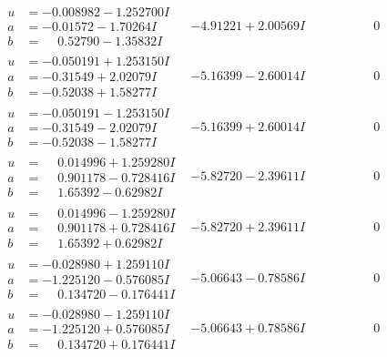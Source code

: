\documentclass[1p]{elsarticle_modified}
\theoremstyle{definition}
\begin{document}
$$\begin{array}{c|c|c}
\begin{aligned}
u &= -0.008982 - 1.252700 I \\
a &= -0.01572 - 1.70264 I \\
b &= \phantom{-}0.52790 - 1.35832 I\end{aligned}
 & -4.91221 + 2.00569 I & \phantom{-0.000000 } 0 \\ \hline\begin{aligned}
u &= -0.050191 + 1.253150 I \\
a &= -0.31549 + 2.02079 I \\
b &= -0.52038 + 1.58277 I\end{aligned}
 & -5.16399 - 2.60014 I & \phantom{-0.000000 } 0 \\ \hline\begin{aligned}
u &= -0.050191 - 1.253150 I \\
a &= -0.31549 - 2.02079 I \\
b &= -0.52038 - 1.58277 I\end{aligned}
 & -5.16399 + 2.60014 I & \phantom{-0.000000 } 0 \\ \hline\begin{aligned}
u &= \phantom{-}0.014996 + 1.259280 I \\
a &= \phantom{-}0.901178 - 0.728416 I \\
b &= \phantom{-}1.65392 - 0.62982 I\end{aligned}
 & -5.82720 - 2.39611 I & \phantom{-0.000000 } 0 \\ \hline\begin{aligned}
u &= \phantom{-}0.014996 - 1.259280 I \\
a &= \phantom{-}0.901178 + 0.728416 I \\
b &= \phantom{-}1.65392 + 0.62982 I\end{aligned}
 & -5.82720 + 2.39611 I & \phantom{-0.000000 } 0 \\ \hline\begin{aligned}
u &= -0.028980 + 1.259110 I \\
a &= -1.225120 - 0.576085 I \\
b &= \phantom{-}0.134720 - 0.176441 I\end{aligned}
 & -5.06643 - 0.78586 I & \phantom{-0.000000 } 0 \\ \hline\begin{aligned}
u &= -0.028980 - 1.259110 I \\
a &= -1.225120 + 0.576085 I \\
b &= \phantom{-}0.134720 + 0.176441 I\end{aligned}
 & -5.06643 + 0.78586 I & \phantom{-0.000000 } 0\\

\end{array}$$
\end{document}
